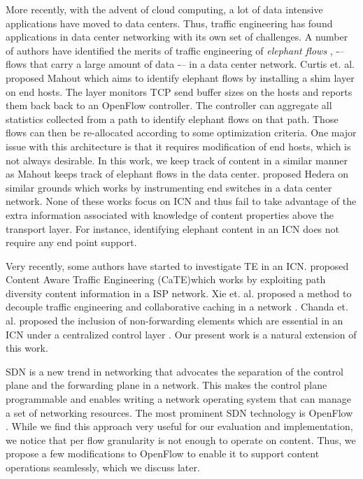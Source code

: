\documentclass[conference]{IEEEtran}
\begin{document}
More recently, with the advent of cloud computing, a lot
of data intensive applications have moved to data centers.
Thus, traffic engineering has found applications in data center
networking with its own set of challenges. A number of
authors have identified the merits of traffic engineering of
\emph{elephant flows} \cite{Curtis11}, \cite{Fares10} -– flows that carry a large amount of data -– in a data center network. Curtis et. al. proposed Mahout \cite{Curtis11}
which aims to identify elephant flows by installing a shim layer
on end hosts. The layer monitors TCP send buffer sizes on the
hosts and reports them back back to an OpenFlow controller.
The controller can aggregate all statistics collected from a
path to identify elephant flows on that path. Those flows can
then be re-allocated according to some optimization criteria.
One major issue with this architecture is that it requires
modification of end hosts, which is not always desirable.
In this work, we keep track of content in a similar manner
as Mahout keeps track of elephant flows in the data center.
\cite{Fares10} proposed Hedera on similar grounds which works by
instrumenting end switches in a data center network. None
of these works focus on ICN and thus fail to take advantage
of the extra information associated with knowledge of content
properties above the transport layer. For instance, identifying
elephant content in an ICN does not require any end point
support.

Very recently, some authors have started to investigate TE
in an ICN. \cite{Frank12} proposed Content
Aware Traffic Engineering (CaTE)which works by exploiting
path diversity content information in a ISP network. Xie et.
al. proposed a method to decouple traffic engineering and
collaborative caching in a network \cite{Xie11}. Chanda et. al. proposed
the inclusion of non-forwarding elements which are essential
in an ICN under a centralized control layer \cite{Chanda12}. Our present
work is a natural extension of this work.

SDN is a new trend in networking that advocates the
separation of the control plane and the forwarding plane in
a network. This makes the control plane programmable and
enables writing a network operating system that can manage
a set of networking resources. The most prominent SDN
technology is OpenFlow \cite{nick08}. While we find this approach very
useful for our evaluation and implementation, we notice that
per flow granularity is not enough to operate on content. Thus,
we propose a few modifications to OpenFlow to enable it to support content operations seamlessly, which we discuss later.
\end{document}
